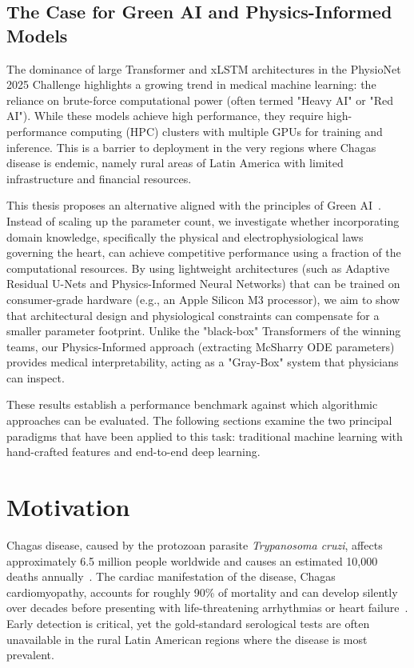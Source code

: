 \subsection{The Case for Green AI and Physics-Informed Models}

The dominance of large Transformer and xLSTM architectures in the PhysioNet 2025 Challenge highlights a growing trend in medical machine learning: the reliance on brute-force computational power (often termed "Heavy AI" or "Red AI"). While these models achieve high performance, they require high-performance computing (HPC) clusters with multiple GPUs for training and inference. This is a barrier to deployment in the very regions where Chagas disease is endemic, namely rural areas of Latin America with limited infrastructure and financial resources.

This thesis proposes an alternative aligned with the principles of Green AI~\cite{lapicque2025greenai}. Instead of scaling up the parameter count, we investigate whether incorporating domain knowledge, specifically the physical and electrophysiological laws governing the heart, can achieve competitive performance using a fraction of the computational resources. By using lightweight architectures (such as Adaptive Residual U-Nets and Physics-Informed Neural Networks) that can be trained on consumer-grade hardware (e.g., an Apple Silicon M3 processor), we aim to show that architectural design and physiological constraints can compensate for a smaller parameter footprint. Unlike the "black-box" Transformers of the winning teams, our Physics-Informed approach (extracting McSharry ODE parameters) provides medical interpretability, acting as a "Gray-Box" system that physicians can inspect.

These results establish a performance benchmark against which algorithmic approaches can be evaluated. The following sections examine the two principal paradigms that have been applied to this task: traditional machine learning with hand-crafted features and end-to-end deep learning.



\section{Motivation}

Chagas disease, caused by the protozoan parasite \textit{Trypanosoma cruzi}, affects approximately 6.5 million people worldwide and causes an estimated 10,000 deaths annually~\cite{reyna2024detection}. The cardiac manifestation of the disease, Chagas cardiomyopathy, accounts for roughly 90\% of mortality and can develop silently over decades before presenting with life-threatening arrhythmias or heart failure~\cite{nunes2018chagas}. Early detection is critical, yet the gold-standard serological tests are often unavailable in the rural Latin American regions where the disease is most prevalent.

